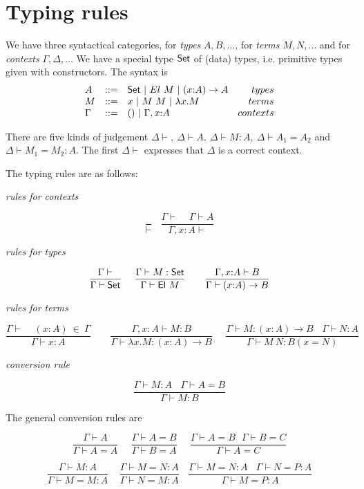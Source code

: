 \documentclass[11pt]{article}
\def\SET{\hbox{\sf Set}}
\def\EL{\hbox{\sf El}}
\begin{document}
\section{Typing rules}

 We have three syntactical categories, for {\em types} $A,B,\dots$, for
{\em terms} $M,N,\dots$ and for {\em contexts} $\Gamma,\Delta,\dots$ We have
a special type $\SET$ of (data) types, i.e. primitive types given with
constructors. The syntax is
$$\begin{array}{lclr}
A  & ::= & \SET~|~El~M~|~(x{:}A)\rightarrow A  & types \\
M & ::= & x~|~M~M~|~\lambda x.M & terms \\
\Gamma & ::= & ()~|~\Gamma,x{:}A & contexts
\end{array}$$

 There are five kinds of judgement $\Delta\vdash,~\Delta\vdash A,~\Delta\vdash M:A,~\Delta\vdash A_1=A_2$
and $\Delta\vdash M_1=M_2:A$.
The first $\Delta\vdash$ expresses that $\Delta$ is a correct context. 

 The typing rules are as follows:

\medskip
 {\em rules for contexts}

$$
\frac{}{\vdash}~~~~
\frac{\Gamma\vdash~~~~~\Gamma\vdash A}{\Gamma,x{:}A\vdash}
$$

 {\em rules for types}

$$
\frac{\Gamma\vdash}{\Gamma\vdash \SET}~~~~
\frac{\Gamma\vdash M:\SET}{\Gamma\vdash \EL~M}~~~~~~
\frac{\Gamma,x{:}A\vdash B}{\Gamma\vdash (x{:}A)\rightarrow B}
$$

 {\em rules for terms}

$$
\frac{\Gamma\vdash~~~~~(x{:}A)~\in~\Gamma}{\Gamma\vdash x{:}A}~~~~~~~~~
\frac{\Gamma,x{:}A\vdash M:B}{\Gamma\vdash \lambda x.M:(x{:}A)\rightarrow B}~~~~~~
\frac{\Gamma\vdash M:(x{:}A)\rightarrow B~~~~\Gamma\vdash N:A}{\Gamma\vdash M~N:B(x=N)}
$$

 {\em conversion rule}

$$
\frac{\Gamma\vdash M:A~~~~\Gamma\vdash A=B}{\Gamma\vdash M:B}
$$

\medskip
\medskip


 The general conversion rules are

$$
\frac{\Gamma\vdash A}{\Gamma\vdash A=A}~~~~~~
\frac{\Gamma\vdash A=B}{\Gamma\vdash B=A}~~~~~~
\frac{\Gamma\vdash A=B~~~\Gamma\vdash B=C}{\Gamma\vdash A=C}
$$

$$
\frac{\Gamma\vdash M:A}{\Gamma\vdash M=M:A}~~~~~
\frac{\Gamma\vdash M=N:A}{\Gamma\vdash N=M:A}~~~~
\frac{\Gamma\vdash M=N:A~~~~\Gamma\vdash N=P:A}{\Gamma\vdash M=P:A}
$$
\end{document}
